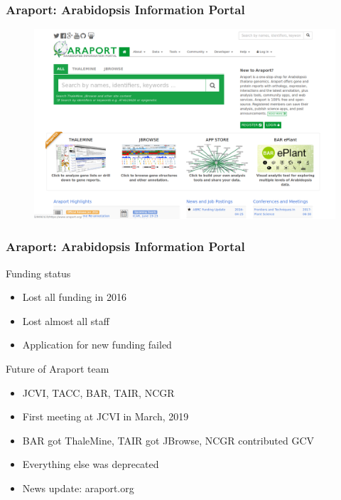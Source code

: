 \documentclass{beamer}
\begin{document}
\begin{frame}
    \frametitle{Araport: Arabidopsis Information Portal}
    \begin{figure}[H]
        \centering
        \includegraphics[width=\columnwidth]{img/Araport2017.png}
    \end{figure}
\end{frame}

\begin{frame}
    \frametitle{Araport: Arabidopsis Information Portal}
    Funding status
    \begin{itemize}
        \item Lost all funding in 2016
        \item Lost almost all staff 
        \item Application for new funding failed
    \end{itemize}
    Future of Araport team
    \begin{itemize}
        \item JCVI, TACC, BAR, TAIR, NCGR
        \item First meeting at JCVI in March, 2019
        \item BAR got ThaleMine, TAIR got JBrowse, NCGR contributed GCV
        \item Everything else was deprecated
        \item News update: araport.org
    \end{itemize}
\end{frame}
\end{document}
